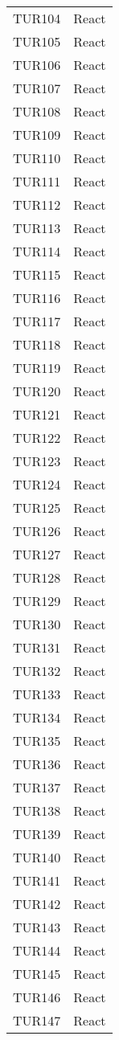 \documentclass[PianoDiQualifica.tex]{subfiles}
\begin{document}
\begin{longtable}[H]{P{5cm}P{9cm}}
	TUR104 & React \\ 
	TUR105 & React \\ 
	TUR106 & React \\ 
	TUR107 & React \\ 
	TUR108 & React \\ 
	TUR109 & React \\ 
	TUR110 & React \\ 
	TUR111 & React \\ 
	TUR112 & React \\ 
	TUR113 & React \\ 
	TUR114 & React \\ 
	TUR115 & React \\ 
	TUR116 & React \\ 
	TUR117 & React \\ 
	TUR118 & React \\ 
	TUR119 & React \\ 
	TUR120 & React \\ 
	TUR121 & React \\ 
	TUR122 & React \\ 
	TUR123 & React \\ 
	TUR124 & React \\ 
	TUR125 & React \\ 
	TUR126 & React \\ 
	TUR127 & React \\ 
	TUR128 & React \\ 
	TUR129 & React \\ 
	TUR130 & React \\ 
	TUR131 & React \\ 
	TUR132 & React \\ 
	TUR133 & React \\ 
	TUR134 & React \\ 
	TUR135 & React \\ 
	TUR136 & React \\ 
	TUR137 & React \\ 
	TUR138 & React \\ 
	TUR139 & React \\ 
	TUR140 & React \\ 
	TUR141 & React \\ 
	TUR142 & React \\ 
	TUR143 & React \\ 
	TUR144 & React \\ 
	TUR145 & React \\ 
	TUR146 & React \\ 
	TUR147 & React \\ 

\end{longtable}
\end{document}
